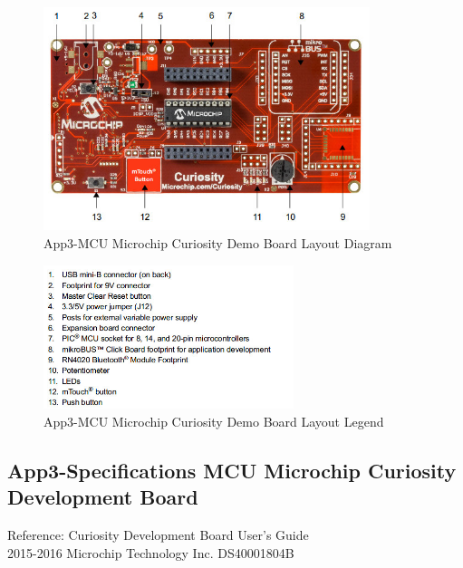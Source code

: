 \begin{figure}[htbp]
	\begin{center}
		\includegraphics[width=0.85\textwidth]{./07-images/img-Ch3App/MCU-Curiosity-Dev-Board-Layout.jpg}
		\caption{App3-MCU Microchip Curiosity Demo Board Layout Diagram}
		\label{fig:App3-MCU-Curiosity-Dev-Board-Layout.jpg}
	\end{center}
\end{figure}
\begin{figure}[htbp]
	\begin{center}
		\includegraphics[width=0.65\textwidth]{./07-images/img-Ch3App/MCU-Curiosity-Dev-Board-Layout-Legend.jpg}
		\caption{App3-MCU Microchip Curiosity Demo Board Layout Legend}
		\label{fig:App3-MCU-Curiosity-Dev-Board-Layout-Legend.jpg}
	\end{center}
\end{figure}

\pagebreak
\subsection{App3-Specifications MCU Microchip Curiosity Development Board}
Reference: Curiosity Development Board User's Guide\\
2015-2016 Microchip Technology Inc. DS40001804B\\
\vspace{0.5cm}

